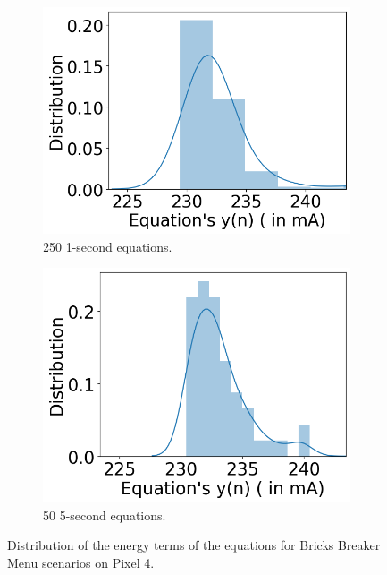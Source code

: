 \begin{figure}[tp]
    \centering
         \begin{subfigure}[b]{0.49\columnwidth}
         \centering
         \includegraphics[width=\textwidth]{figures/004_Pixel4_bricksbreaker_menu_250_1_distribution_y_n.png}
         \caption{250 1-second equations.}
         \label{fig:y_n_boatracing_intro_1_500}
    \end{subfigure}
    \hfill
    \begin{subfigure}[b]{0.49\columnwidth}
         \centering
         \includegraphics[width=\textwidth]{figures/004_Pixel4_bricksbreaker_menu_250_5_distribution_y_n.png}
         \caption{50 5-second equations.}
         \label{fig:y_n_boatracing_intro_5_500}
    \end{subfigure}
    \caption{Distribution of the energy terms of the
    equations for Bricks Breaker Menu scenarios on Pixel 4.}
    \label{fig:y_distribution}
\end{figure}

